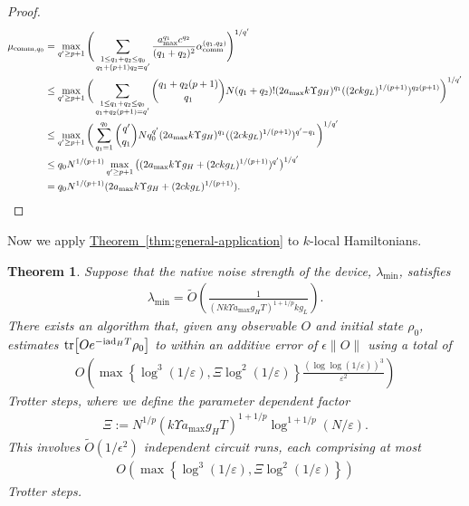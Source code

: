 \documentclass[11pt]{article}
\newtheorem{theorem}{Theorem}
\newcommand{\thm}[1]{\hyperref[thm:#1]{Theorem~\ref*{thm:#1}}}
\renewcommand{\i}{\mathrm{i}}
\newcommand{\ad}{\mathrm{ad}}
\newcommand{\eps}{\varepsilon}
\begin{document}
\begin{proof}
\begin{align*}
        \mu_{\mathrm{comm},q_0} &= \max_{q' \ge p+1} \Bigg(\sum_{\substack{1\le q_1+q_2\le q_0 \\
        q_1+(p+1)q_2 = q'}}\frac{a_{\max}^{q_1}c^{q_2}}{(q_1+q_2)^2} \alpha_{\rm comm}^{(q_1, q_2)}\Bigg)^{1/q'} \\
        &\le \max_{q' \ge p+1} \bigg(\sum_{\substack{1\le q_1+q_2\le q_0 \\
        q_1+q_2(p+1) = q'}}\binom{q_1+q_2(p+1)}{q_1}N(q_1+q_2)!(2a_{\max}k\Upsilon g_H)^{q_1}((2ckg_L)^{1/(p+1)})^{q_2(p+1)}\bigg)^{1/q'}\\
        &\le \max_{q' \ge p+1} \bigg(\sum_{q_1=1}^{q_0}\binom{q'}{q_1}Nq_0^{q'}(2a_{\max}k\Upsilon g_H)^{q_1}((2ckg_L)^{1/(p+1)})^{q'-q_1}\bigg)^{1/q'}\\
        &\le q_0N^{1/(p+1)}\max_{q'\ge p+1} \big((2a_{\max}k\Upsilon g_H+(2ckg_L)^{1/(p+1)})^{q'}\big)^{1/q'}\\
        &=q_0N^{1/(p+1)}(2a_{\max}k\Upsilon g_H+(2ckg_L)^{1/(p+1)}).
    \end{align*}
\end{proof}

Now we apply \thm{general-application} to $k$-local Hamiltonians.  
\begin{theorem}
\label{thm:extrapolation-k-local}
    Suppose that the native noise strength of the device, $\lambda_{\min}$, satisfies
    \begin{align}
    \label{eq:cond-lambda}
        \lambda_{\min} = \widetilde{O}\left(\frac{1}{(Nk\Upsilon a_{\max}g_HT)^{1+1/p} kg_L}\right).
    \end{align} 
    There exists an algorithm that, given any observable $O$ and initial state $\rho_0$, estimates $\tr[O e^{-\i \ad_H T}\rho_0]$ to within an additive error of $\epsilon\|O\|$ using a total of 
    \begin{align*}
        O\left( \max\left\{\log^3(1/\eps), \Xi \log^2(1/\eps)\right\} \frac{(\log\log (1/\eps))^3}{\eps^2} \right)
    \end{align*}
    Trotter steps, where we define the parameter dependent factor
    \begin{align*}
        \Xi := N^{1/p}(k\Upsilon a_{\max} g_H T)^{1+1/p} \log^{1+1/p}(N/\eps).
    \end{align*}
    This involves $\widetilde{O}(1/\epsilon^2)$ independent circuit runs, each comprising at most
    \begin{align*}
        O\left( \max\left\{\log^3(1/\eps), \Xi \log^2(1/\eps)\right\} \right)
    \end{align*}
    Trotter steps.
\end{theorem}
\end{document}
